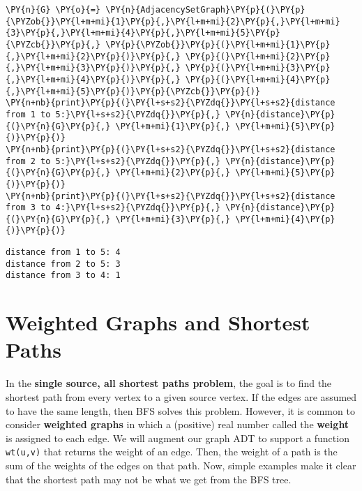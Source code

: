 \begin{Verbatim}[commandchars=\\\{\}]
\PY{n}{G} \PY{o}{=} \PY{n}{AdjacencySetGraph}\PY{p}{(}\PY{p}{\PYZob{}}\PY{l+m+mi}{1}\PY{p}{,}\PY{l+m+mi}{2}\PY{p}{,}\PY{l+m+mi}{3}\PY{p}{,}\PY{l+m+mi}{4}\PY{p}{,}\PY{l+m+mi}{5}\PY{p}{\PYZcb{}}\PY{p}{,} \PY{p}{\PYZob{}}\PY{p}{(}\PY{l+m+mi}{1}\PY{p}{,}\PY{l+m+mi}{2}\PY{p}{)}\PY{p}{,} \PY{p}{(}\PY{l+m+mi}{2}\PY{p}{,}\PY{l+m+mi}{3}\PY{p}{)}\PY{p}{,} \PY{p}{(}\PY{l+m+mi}{3}\PY{p}{,}\PY{l+m+mi}{4}\PY{p}{)}\PY{p}{,} \PY{p}{(}\PY{l+m+mi}{4}\PY{p}{,}\PY{l+m+mi}{5}\PY{p}{)}\PY{p}{\PYZcb{}}\PY{p}{)}
\PY{n+nb}{print}\PY{p}{(}\PY{l+s+s2}{\PYZdq{}}\PY{l+s+s2}{distance from 1 to 5:}\PY{l+s+s2}{\PYZdq{}}\PY{p}{,} \PY{n}{distance}\PY{p}{(}\PY{n}{G}\PY{p}{,} \PY{l+m+mi}{1}\PY{p}{,} \PY{l+m+mi}{5}\PY{p}{)}\PY{p}{)}
\PY{n+nb}{print}\PY{p}{(}\PY{l+s+s2}{\PYZdq{}}\PY{l+s+s2}{distance from 2 to 5:}\PY{l+s+s2}{\PYZdq{}}\PY{p}{,} \PY{n}{distance}\PY{p}{(}\PY{n}{G}\PY{p}{,} \PY{l+m+mi}{2}\PY{p}{,} \PY{l+m+mi}{5}\PY{p}{)}\PY{p}{)}
\PY{n+nb}{print}\PY{p}{(}\PY{l+s+s2}{\PYZdq{}}\PY{l+s+s2}{distance from 3 to 4:}\PY{l+s+s2}{\PYZdq{}}\PY{p}{,} \PY{n}{distance}\PY{p}{(}\PY{n}{G}\PY{p}{,} \PY{l+m+mi}{3}\PY{p}{,} \PY{l+m+mi}{4}\PY{p}{)}\PY{p}{)}
\end{Verbatim}

\begin{Verbatim}
distance from 1 to 5: 4
distance from 2 to 5: 3
distance from 3 to 4: 1
\end{Verbatim}

\section{Weighted Graphs and Shortest Paths}


In the \textbf{single source, all shortest paths problem}, the goal is to find the shortest path from every vertex to a given source vertex.
If the edges are assumed to have the same length, then BFS solves this problem.
However, it is common to consider \textbf{weighted graphs} in which a (positive) real number called the \textbf{weight} is assigned to each edge.
We will augment our graph ADT to support a function \texttt{wt(u,v)} that returns the weight of an edge.
Then, the weight of a path is the sum of the weights of the edges on that path.
Now, simple examples make it clear that the shortest path may not be what we get from the BFS tree.


